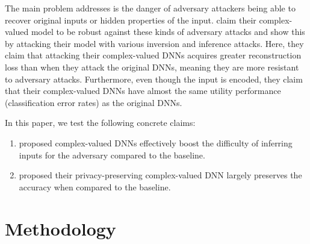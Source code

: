 
The main problem \cite{xiang2020interpretable} addresses is the danger of adversary attackers being able to recover original inputs or hidden properties of the input. 
\cite{xiang2020interpretable} claim their complex-valued model to be robust against these kinds of adversary attacks and show this by attacking their model with various inversion and inference attacks. Here, they claim that attacking their complex-valued DNNs acquires greater reconstruction loss than when they attack the original DNNs, meaning they are more resistant to adversary attacks. Furthermore, even though the input is encoded, they claim that their complex-valued DNNs have almost the same utility performance (classification error rates) as the original DNNs. 

In this paper, we test the following concrete claims:
\begin{enumerate}
    \item \cite{xiang2020interpretable} proposed complex-valued DNNs effectively boost the difficulty of inferring inputs for the adversary compared to the baseline. \label{claim1}
    \item \cite{xiang2020interpretable} proposed their privacy-preserving complex-valued DNN largely preserves the accuracy when compared to the baseline. \label{claim2}
\end{enumerate}



\section{Methodology}

